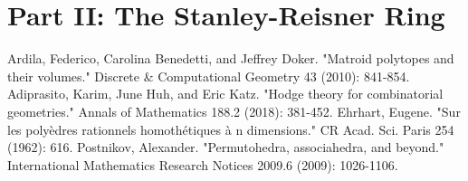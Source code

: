 \documentclass[12pt]{article}
\theoremstyle{definition}
\numberwithin{equation}{subsection}
\begin{document}
\section*{Part II: The Stanley-Reisner Ring}

\begin{thebibliography}{99}
     Ardila, Federico, Carolina Benedetti, and Jeffrey Doker. "Matroid polytopes and their volumes." Discrete \& Computational Geometry 43 (2010): 841-854.
     Adiprasito, Karim, June Huh, and Eric Katz. "Hodge theory for combinatorial geometries." Annals of Mathematics 188.2 (2018): 381-452.
     Ehrhart, Eugene. "Sur les polyèdres rationnels homothétiques à n dimensions." CR Acad. Sci. Paris 254 (1962): 616.
     Postnikov, Alexander. "Permutohedra, associahedra, and beyond." International Mathematics Research Notices 2009.6 (2009): 1026-1106.
\end{thebibliography}
\end{document}
